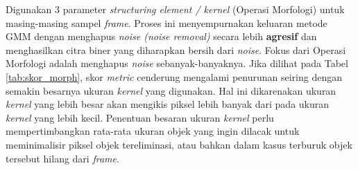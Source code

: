         Digunakan $3$ parameter \textit{structuring element / kernel} (Operasi Morfologi) untuk masing-masing sampel \textit{frame}. Proses ini menyempurnakan keluaran metode GMM dengan menghapus \textit{noise (noise removal)} secara lebih \textbf{agresif} dan menghasilkan citra biner yang diharapkan bersih dari \textit{noise}. Fokus dari Operasi Morfologi adalah menghapus \textit{noise} sebanyak-banyaknya. Jika dilihat pada Tabel \ref{tab:skor_morph}, skor \textit{metric} cenderung mengalami penurunan seiring dengan semakin besarnya ukuran \textit{kernel} yang digunakan. Hal ini dikarenakan ukuran \textit{kernel} yang lebih besar akan mengikis piksel lebih banyak dari pada ukuran \textit{kernel} yang lebih kecil. Penentuan besaran ukuran \textit{kernel} perlu mempertimbangkan rata-rata ukuran objek yang ingin dilacak untuk meminimalisir piksel objek tereliminasi, atau bahkan dalam kasus terburuk objek tersebut hilang dari \textit{frame}.

